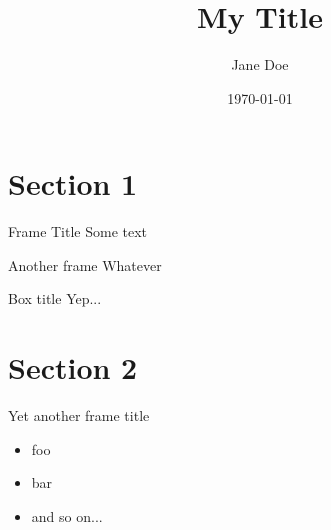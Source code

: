 \documentclass{beamer}
\title{My Title}
\date{\today}
\author{Jane Doe}
\institute{Wegtam GmbH}
\begin{document}
  \maketitle

  \section{Section 1}
  \begin{frame}{Frame Title}
    Some text
  \end{frame}

  \begin{frame}{Another frame}
    Whatever
    \begin{alertblock}{Box title}
      Yep...
    \end{alertblock}
  \end{frame}

  \section{Section 2}
  \begin{frame}{Yet another frame title}
    \begin{itemize}
      \item foo
      \item bar
      \item and so on...
    \end{itemize}
  \end{frame}
\end{document}
